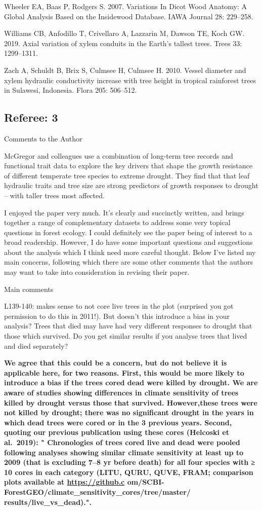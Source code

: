 \documentclass[
]{article}
\begin{document}
Wheeler EA, Baas P, Rodgers S. 2007. Variations In Dicot Wood Anatomy: A
Global Analysis Based on the Insidewood Database. IAWA Journal 28:
229--258.

Williams CB, Anfodillo T, Crivellaro A, Lazzarin M, Dawson TE, Koch GW.
2019. Axial variation of xylem conduits in the Earth's tallest trees.
Trees 33: 1299--1311.

Zach A, Schuldt B, Brix S, Culmsee H, Culmsee H. 2010. Vessel diameter
and xylem hydraulic conductivity increase with tree height in tropical
rainforest trees in Sulawesi, Indonesia. Flora 205: 506--512.

\hypertarget{referee-3}{%
\subsection{Referee: 3}\label{referee-3}}

Comments to the Author

McGregor and colleagues use a combination of long-term tree records and
functional trait data to explore the key drivers that shape the growth
resistance of different temperate tree species to extreme drought. They
find that that leaf hydraulic traits and tree size are strong predictors
of growth responses to drought -- with taller trees most affected.

I enjoyed the paper very much. It's clearly and succinctly written, and
brings together a range of complementary datasets to address some very
topical questions in forest ecology. I could definitely see the paper
being of interest to a broad readership. However, I do have some
important questions and suggestions about the analysis which I think
need more careful thought. Below I've listed my main concerns, following
which there are some other comments that the authors may want to take
into consideration in revising their paper.

Main comments

L139-140: makes sense to not core live trees in the plot (surprised you
got permission to do this in 2011!). But doesn't this introduce a bias
in your analysis? Trees that died may have had very different responses
to drought that those which survived. Do you get similar results if you
analyse trees that lived and died separately?

\textbf{We agree that this could be a concern, but do not believe it is
applicable here, for two reasons. First, this would be more likely to
introduce a bias if the trees cored dead were killed by drought. We are
aware of studies showing differences in climate sensitivity of trees
killed by drought versus those that survived. However,these trees were
not killed by drought; there was no significant drought in the years in
which dead trees were cored or in the 3 previous years. Second, quoting
our previous publication using these cores (Helcoski et al.~2019): "
Chronologies of trees cored live and dead were pooled following analyses
showing similar climate sensitivity at least up to 2009 (that is
excluding 7--8 yr before death) for all four species with ≥ 10 cores in
each category (LITU, QURU, QUVE, FRAM; comparison plots available at
\url{https://github.c}
om/SCBI-ForestGEO/climate\_sensitivity\_cores/tree/master/
results/live\_vs\_dead).".}
\end{document}
